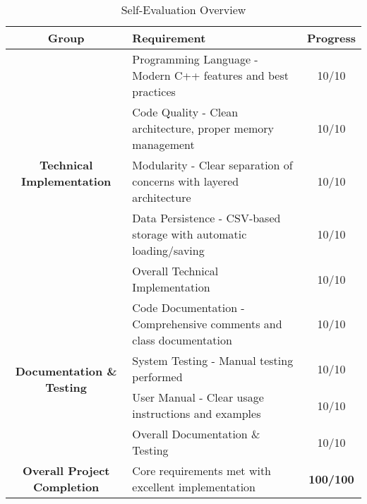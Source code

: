 \newpage
\begin{center}
	\begin{table}[H]
		\renewcommand{\arraystretch}{1.5}
		\setlength{\tabcolsep}{8pt}

		\begin{tabularx}{\textwidth}{| c | X | c |}
			\hline
			\rowcolor{gray!30}
			\textbf{Group} & \textbf{Requirement}                                                & \textbf{Progress} \\
			\hline



			\multirow{5}{*}{\parbox{4cm}{\centering\textbf{Technical Implementation}}}
			               & Programming Language - Modern C++ features and best practices       & 10/10             \\
			\cline{2-3}
			               & Code Quality - Clean architecture, proper memory management         & 10/10             \\
			\cline{2-3}
			               & Modularity - Clear separation of concerns with layered architecture & 10/10             \\
			\cline{2-3}
			               & Data Persistence - CSV-based storage with automatic loading/saving  & 10/10             \\
			\cline{2-3}
			               & Overall Technical Implementation                                    & 10/10             \\
			\hline

			\multirow{4}{*}{\parbox{4cm}{\centering\textbf{Documentation \& Testing}}}
			               & Code Documentation - Comprehensive comments and class documentation & 10/10             \\
			\cline{2-3}
			               & System Testing - Manual testing performed                           & 10/10             \\
			\cline{2-3}
			               & User Manual - Clear usage instructions and examples                 & 10/10             \\
			\cline{2-3}
			               & Overall Documentation \& Testing                                    & 10/10             \\
			\hline
			\textbf{Overall Project Completion}
			               & Core requirements met with excellent implementation                 & \textbf{100/100}  \\
			\hline
		\end{tabularx}

		\caption{Self-Evaluation Overview}
	\end{table}
\end{center}
